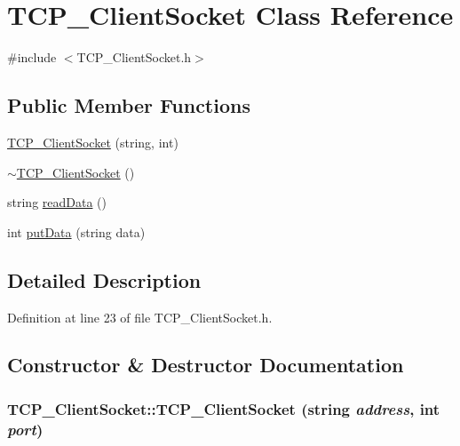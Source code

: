 \hypertarget{class_t_c_p___client_socket}{
\section{TCP\_\-ClientSocket Class Reference}
\label{class_t_c_p___client_socket}
}


{\ttfamily \#include $<$TCP\_\-ClientSocket.h$>$}

\subsection*{Public Member Functions}
\begin{DoxyCompactItemize}
\item 
\hyperlink{class_t_c_p___client_socket_afb55d55eba1ce2b979f200849f4aa2ae}{TCP\_\-ClientSocket} (string, int)
\item 
\hyperlink{class_t_c_p___client_socket_a4c72face71a46add0f3a96975075aa71}{$\sim$TCP\_\-ClientSocket} ()
\item 
string \hyperlink{class_t_c_p___client_socket_a9305953edacf32da51b0b18b19c22512}{readData} ()
\item 
int \hyperlink{class_t_c_p___client_socket_a5ef81cfbe2abbe303801767d037c66de}{putData} (string data)
\end{DoxyCompactItemize}


\subsection{Detailed Description}


Definition at line 23 of file TCP\_\-ClientSocket.h.



\subsection{Constructor \& Destructor Documentation}
\hypertarget{class_t_c_p___client_socket_afb55d55eba1ce2b979f200849f4aa2ae}{
\subsubsection[{TCP\_\-ClientSocket}]{\setlength{\rightskip}{0pt plus 5cm}TCP\_\-ClientSocket::TCP\_\-ClientSocket (string {\em address}, \/  int {\em port})}}
\label{class_t_c_p___client_socket_afb55d55eba1ce2b979f200849f4aa2ae}


